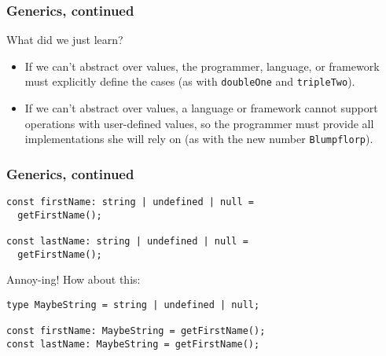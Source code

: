 \documentclass{beamer}
\begin{document}
\begin{frame}[fragile]
  \frametitle{Generics, continued}

  What did we just learn? \\

  \begin{itemize}
    \item If we can't abstract over values, the programmer, language, or
          framework must explicitly define the cases (as with
          \texttt{doubleOne} and \texttt{tripleTwo}).
    \item If we can't abstract over values, a language or framework cannot
          support operations with user-defined values, so the programmer must
          provide all implementations she will rely on (as with the new
          number \texttt{Blumpflorp}).
  \end{itemize}
\end{frame}

\begin{frame}[fragile]
  \frametitle{Generics, continued}

  \begin{verbatim}
const firstName: string | undefined | null =
  getFirstName();

const lastName: string | undefined | null =
  getFirstName();
  \end{verbatim}

  \vspace{1em}

  Annoy-ing! How about this: \\

  \begin{verbatim}
type MaybeString = string | undefined | null;

const firstName: MaybeString = getFirstName();
const lastName: MaybeString = getFirstName();
  \end{verbatim}
\end{frame}
\end{document}
